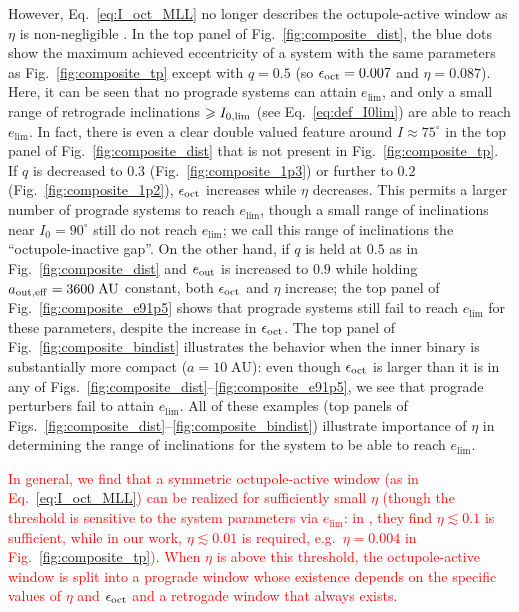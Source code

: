 \documentclass[
        fleqn,
        usenatbib,
    ]{mnras}
\begin{document}
However, Eq.~\eqref{eq:I_oct_MLL} no longer describes the octupole-active window
as $\eta$ is non-negligible \citep[see also][]{rodet_inprep}. In the top panel
of Fig.~\ref{fig:composite_dist}, the blue dots show the maximum achieved
eccentricity of a system with the same parameters as Fig.~\ref{fig:composite_tp}
except with $q = 0.5$ (so $\epsilon_{\rm oct} = 0.007$ and $\eta = 0.087$).
Here, it can be seen that no prograde systems can attain $e_{\lim}$, and only a
small range of retrograde inclinations $\geq I_{\rm 0, \lim}$ (see
Eq.~\ref{eq:def_I0lim}) are able to reach $e_{\lim}$. In fact, there is even a
clear double valued feature around $I \approx 75^\circ$ in the top panel of
Fig.~\ref{fig:composite_dist} that is not present in
Fig.~\ref{fig:composite_tp}. If $q$ is decreased to $0.3$
(Fig.~\ref{fig:composite_1p3}) or further to $0.2$
(Fig.~\ref{fig:composite_1p2}), $\epsilon_{\rm oct}$ increases while $\eta$
decreases. This permits a larger number of prograde systems to reach $e_{\lim}$,
though a small range of inclinations near $I_0 = 90^\circ$ still do not reach
$e_{\lim}$; we call this range of inclinations the ``octupole-inactive gap''. On
the other hand, if $q$ is held at $0.5$ as in Fig.~\ref{fig:composite_dist} and
$e_{\rm out}$ is increased to $0.9$ while holding $a_{\rm out, eff} =
3600\;\mathrm{AU}$ constant, both $\epsilon_{\rm oct}$ and $\eta$ increase; the
top panel of Fig.~\ref{fig:composite_e91p5} shows that prograde systems still
fail to reach $e_{\lim}$ for these parameters, despite the increase in
$\epsilon_{\rm oct}$. The top panel of Fig.~\ref{fig:composite_bindist}
illustrates the behavior when the inner binary is substantially more compact ($a
= 10\;\mathrm{AU}$): even though $\epsilon_{\rm oct}$ is larger than it is
in any of Figs.~\ref{fig:composite_dist}--\ref{fig:composite_e91p5}, we
see that prograde perturbers fail to attain $e_{\lim}$. All of these examples
(top panels of Figs.~\ref{fig:composite_dist}--\ref{fig:composite_bindist})
illustrate importance of $\eta$ in determining the range of inclinations for the
system to be able to reach $e_{\lim}$.

\textcolor{red}{In general, we find that a symmetric octupole-active window (as
in Eq.~\ref{eq:I_oct_MLL}) can be realized for sufficiently small $\eta$ (though
the threshold is sensitive to the system parameters via $e_{\lim}$: in
\citet{rodet_inprep}, they find $\eta \lesssim 0.1$ is sufficient, while in our
work, $\eta \lesssim 0.01$ is required, e.g.\ $\eta = 0.004$ in
Fig.~\ref{fig:composite_tp}). When $\eta$ is above this threshold, the
octupole-active window is split into a prograde window whose existence depends
on the specific values of $\eta$ and $\epsilon_{\rm oct}$ and a retrogade window
that always exists.}
\end{document}
